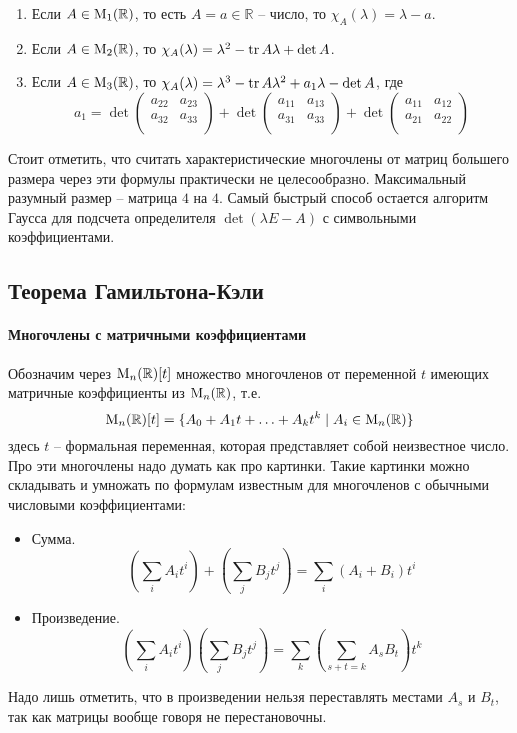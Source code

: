 \begin{enumerate}
\item Если $A\in\operatorname{M}_{1}(\mathbb R)$, то есть $A = a\in\mathbb R$ -- число, то $\chi_A(\lambda) = \lambda - a$.

\item Если $A\in\operatorname{M}_{2}(\mathbb R)$, то $\chi_A(\lambda) = \lambda^2 - \operatorname{tr} A \lambda + \det A$.

\item Если $A\in\operatorname{M}_{3}(\mathbb R)$, то $\chi_A(\lambda) = \lambda^3 - \operatorname{tr} A \lambda^2 + a_1 \lambda - \det A$, где
\[
a_1 = 
\det
\begin{pmatrix}
{a_{22}}&{a_{23}}\\
{a_{32}}&{a_{33}}\\
\end{pmatrix}
+
\det
\begin{pmatrix}
{a_{11}}&{a_{13}}\\
{a_{31}}&{a_{33}}\\
\end{pmatrix}
+
\det
\begin{pmatrix}
{a_{11}}&{a_{12}}\\
{a_{21}}&{a_{22}}\\
\end{pmatrix}
\]
\end{enumerate}

Стоит отметить, что считать характеристические многочлены от матриц большего размера через эти формулы практически не целесообразно.
Максимальный разумный размер -- матрица $4$ на $4$.
Самый быстрый способ остается алгоритм Гаусса для подсчета определителя $\det(\lambda E - A)$ с символьными коэффициентами.



\subsection{Теорема Гамильтона-Кэли}

\paragraph{Многочлены с матричными коэффициентами}

Обозначим через $\operatorname{M}_{n}(\mathbb R)[t]$ множество многочленов от переменной $t$ имеющих матричные коэффициенты из $\operatorname{M}_{n}(\mathbb R)$, т.е.
\[
\operatorname{M}_{n}(\mathbb R)[t] = \{A_0+A_1t+\ldots + A_k t^k\mid A_i\in \operatorname{M}_{n}(\mathbb R)\}
\]
здесь $t$ -- формальная переменная, которая представляет собой неизвестное число.
Про эти многочлены надо думать как про картинки.
Такие картинки можно складывать и умножать по формулам известным для многочленов с обычными числовыми коэффициентами:
\begin{itemize}
\item Сумма.
\[
\left(\sum_{i}A_i t^i\right) +\left (\sum_{j}B_j t^j\right) = \sum_{i}(A_i+ B_i) t^i
\]

\item Произведение.
\[
\left(\sum_i A_i t^i\right)\left( \sum_j B_j t^j\right) = \sum_k \left(\sum_{s+t = k}A_s B_t\right)t^k
\]
\end{itemize}
Надо лишь отметить, что в произведении нельзя переставлять местами $A_s$ и $B_t$, так как матрицы вообще говоря не перестановочны.

